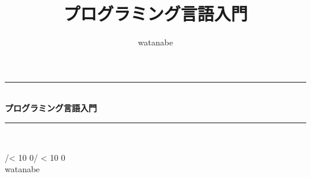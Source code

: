 \documentclass[mingoth,oneside]{jsbook}
\title{ {\Huge プログラミング言語入門}}
\author{watanabe}
\newcommand{\todayd}{%
\the\year/{\ifnum \month < 10 0\the\month \else \the\month \fi}/%
{\ifnum \day < 10 0\the\day \else \the\day \fi}}
\newcommand{\HRule}{\rule{\linewidth}{0.5mm}}
\begin{document}
\begin{titlepage}
\begin{center}

\vspace*{5cm}
\HRule \\[0.4cm]
{ \huge \bfseries プログラミング言語入門}\\[0.4cm]

\HRule \\[1.5cm]

\vspace*{8cm}

\begin{minipage}{0.4\textwidth}
\begin{flushright} \large
{\large \todayd} \\

watanabe
\end{flushright}
\end{minipage}


\vspace*{3cm}

\end{center}
\end{titlepage}




\tableofcontents








\end{document}
